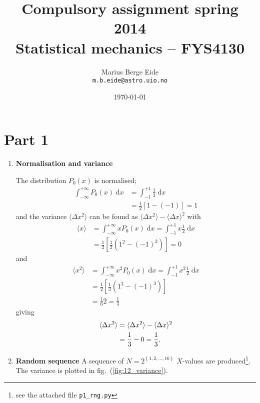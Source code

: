 \documentclass[a4paper,11pt]{article}
\date{\today}
\title{Compulsory assignment spring 2014\\ \small{Statistical mechanics -- FYS4130}}
\author{Marius Berge Eide \\ \texttt{m.b.eide@astro.uio.no}}
\newcommand{\diff}{\ensuremath{\; \text{d}}}
\begin{document}
\onecolumn
\maketitle{}


\section{Part 1}

\begin{enumerate}
    \item \textbf{Normalisation and variance}

        The distribution $P_0(x)$ is normalised;
        \begin{align*}
            \int_{-\infty}^{+\infty} P_0(x) \diff x &= \int_{-1}^{+1} \frac{1}{2} \diff x \\
            &= \frac{1}{2} \left[ 1 - \left( -1 \right) \right] = 1
        \end{align*}
        and the variance $\langle \Delta x^2 \rangle$ can be found as $\langle \Delta x^2 \rangle - \langle \Delta x \rangle^2$ with
        \begin{align*}
            \langle x \rangle &= \int_{-\infty}^{+\infty} x P_0(x) \diff x = \int_{-1}^{+1} x \frac{1}{2} \diff x \\
            &= \frac{1}{2} \left[ \frac{1}{2} \left( 1^2 - (-1)^2 \right) \right] = 0
        \end{align*}
        and
        \begin{align*}
            \langle x^2 \rangle &=  \int_{-\infty}^{+\infty} x^2 P_0(x) \diff x = \int_{-1}^{+1} x^2 \frac{1}{2} \diff x \\
            &= \frac{1}{2} \left[ \frac{1}{3} \left( 1^3 - (-1)^3 \right) \right] \\
            &= \frac{1}{6} 2 = \frac{1}{3}
        \end{align*}
        giving
        \begin{align}
            \langle \Delta x^2 \rangle &= \langle \Delta x^2 \rangle - \langle \Delta x \rangle^2 \notag \\
            &= \frac{1}{3} - 0 = \frac{1}{3}.
            \label{eq:variance1}
        \end{align}

    \item \textbf{Random sequence}
        A sequence of $N=2^{\left\{1,2,\dots,16  \right\}}$ $X$-values are produced\footnote{see the attached file \texttt{p1\_rng.py}}. The variance is plotted in fig.~(\ref{fig:12_variance}). 


\end{enumerate}
\end{document}
